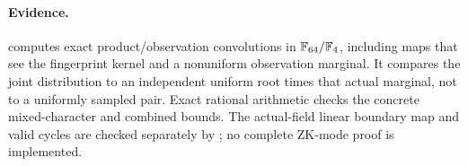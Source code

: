 \paragraph{Evidence.}  computes exact product/observation convolutions in $\mathbb{F}_{64}/\mathbb{F}_4$, including maps that see the fingerprint kernel and a nonuniform observation marginal. It compares the joint distribution to an independent uniform root times that actual marginal, not to a uniformly sampled pair. Exact rational arithmetic checks the concrete mixed-character and combined bounds. The actual-field linear boundary map and valid cycles are checked separately by ; no complete ZK-mode proof is implemented.
